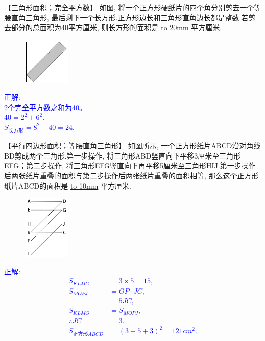 \item {
    【三角形面积；完全平方数】
    {如图, 将一个正方形硬纸片的四个角分别剪去一个等腰直角三角形, 最后剩下一个长方形.正方形边长和三角形直角边长都是整数.若剪去部分的总面积为40平方厘米, 则长方形的面积是 \underline{\hbox to 20mm{}} 平方厘米.} 
    \begin{figure}[H] 
        \centering
        \includegraphics[width=0.2\textwidth]{./pics/Chapter_2/12.png}
    \end{figure}
    \ifshowSolution 
        \fangsong{}\textcolor{blue}{
            正解: \\
            2个完全平方数之和为40。\\
            $40 = 2^2 + 6^2$.\\
            $S_{长方形} = 8^2 - 40 = 24$.
        }
    \else
        \vspace{1cm}
    \fi
}

\item {
    【平行四边形面积；等腰直角三角形】
    {如图所示, 一个正方形纸片ABCD沿对角线BD剪成两个三角形.第一步操作, 将三角形ABD竖直向下平移3厘米至三角形EFG；第二步操作, 将三角形EFG竖直向下再平移5厘米至三角形HIJ.第一步操作后两张纸片重叠的面积与第二步操作后两张纸片重叠的面积相等, 那么这个正方形纸片ABCD的面积是 \underline{\hbox to 10mm{}} 平方厘米.} 
    \begin{figure}[H] 
        \centering
        \includegraphics[width=0.2\textwidth]{./pics/Chapter_2/10.png}
    \end{figure}
    \ifshowSolution 
        \fangsong{}\textcolor{blue}{
            正解: \\
            \begin{align*}
                S_{KLMG} &= 3\times 5 = 15, \\
                S_{MOPJ} &= OP\cdot JC, \\
                &= 5JC, \\
                S_{KLMG} &= S_{MOPJ},\\
                \therefore JC &= 3.\\
                S_{正方形ABCD} &= (3+5+3)^2 = 121 {cm}^2.\\
            \end{align*}
        }
    \else
        \vspace{1cm}
    \fi
}

